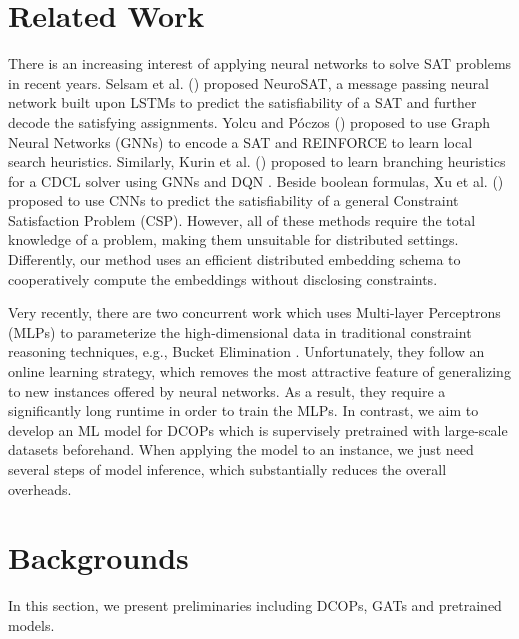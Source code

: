 \documentclass[letterpaper]{article} %
\begin{document}
\section{Related Work}
There is an increasing interest of applying neural networks to solve SAT problems in recent years. Selsam et al. (\citeyear{selsamLBLMD19}) proposed NeuroSAT, a message passing neural network built upon LSTMs \cite{hochreiter1997long} to predict the satisfiability of a SAT and further decode the satisfying assignments. Yolcu and P{\'o}czos (\citeyear{yolcu2019learning}) proposed to use Graph Neural Networks (GNNs) to encode a SAT and REINFORCE \cite{williams1992simple} to learn local search heuristics. Similarly, Kurin et al. (\citeyear{kurin2020can}) proposed to learn branching heuristics for a CDCL solver \cite{een2003extensible} using GNNs and DQN \cite{mnih2015human}. Beside boolean formulas, Xu et al. (\citeyear{xu2018towards}) proposed to use CNNs \cite{cunBDHHHJ89} to predict the satisfiability of a general Constraint Satisfaction Problem (CSP). However, all of these methods require the total knowledge of a problem, making them unsuitable for distributed settings. Differently, our method uses an efficient distributed embedding schema to cooperatively compute the embeddings without disclosing constraints.

Very recently, there are two concurrent work \cite{yanchen21,razeghiKLBAD21} which uses Multi-layer Perceptrons (MLPs) to parameterize the high-dimensional data in traditional constraint reasoning techniques, e.g., Bucket Elimination \cite{dechter98}. Unfortunately, they follow an online learning strategy, which removes the most attractive feature of generalizing to new instances offered by neural networks. As a result, they require a significantly long runtime in order to train the MLPs. In contrast, we aim to develop an ML model for DCOPs which is supervisely pretrained with large-scale datasets beforehand. When applying the model to an instance, we just need several steps of model inference, which substantially reduces the overall overheads.

\section{Backgrounds}
In this section, we present preliminaries including DCOPs, GATs and pretrained models.
\end{document}

